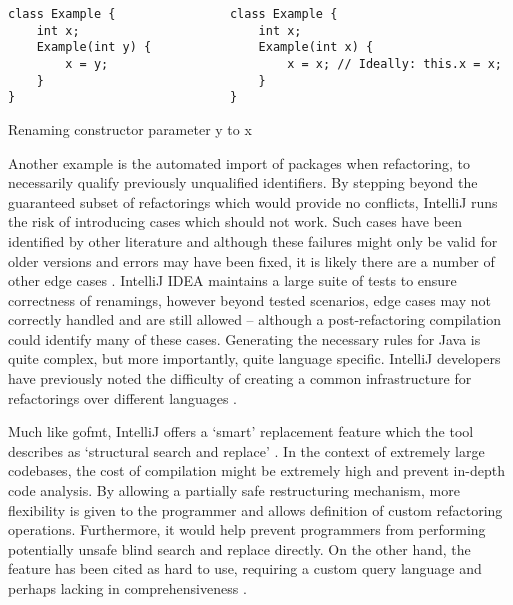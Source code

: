 \begin{center}
\begin{fig}
\begin{verbatim}
class Example {                class Example {
    int x;                         int x;
    Example(int y) {               Example(int x) {
        x = y;                         x = x; // Ideally: this.x = x;
    }                              }
}                              }
\end{verbatim}
\caption{Renaming constructor parameter y to x}
\label{Fig:qual}
\end{fig}
\end{center}

Another example is the automated import of packages when refactoring, to necessarily qualify previously unqualified identifiers. By stepping beyond the guaranteed subset of refactorings which would provide no conflicts, IntelliJ runs the risk of introducing cases which should not work. Such cases have been identified by other literature and although these failures might only be valid for older versions and errors may have been fixed, it is likely there are a number of other edge cases \cite{jemerov2008implementing}. IntelliJ IDEA maintains a large suite of tests to ensure correctness of renamings, however beyond tested scenarios, edge cases may not correctly handled and are still allowed -- although a post-refactoring compilation could identify many of these cases. Generating the necessary rules for Java is quite complex, but more importantly, quite language specific. IntelliJ developers have previously noted the difficulty of creating a common infrastructure for refactorings over different languages \cite{jemerov2008implementing}.

Much like gofmt, IntelliJ offers a `smart' replacement feature which the tool describes as `structural search and replace' \cite{jemerov2008implementing}. In the context of extremely large codebases, the cost of compilation might be extremely high and prevent in-depth code analysis. By allowing a partially safe restructuring mechanism, more flexibility is given to the programmer and allows definition of custom refactoring operations. Furthermore, it would help prevent programmers from performing potentially unsafe blind search and replace directly. On the other hand, the feature has been cited as hard to use, requiring a custom query language and perhaps lacking in comprehensiveness \cite{jemerov2008implementing}.

